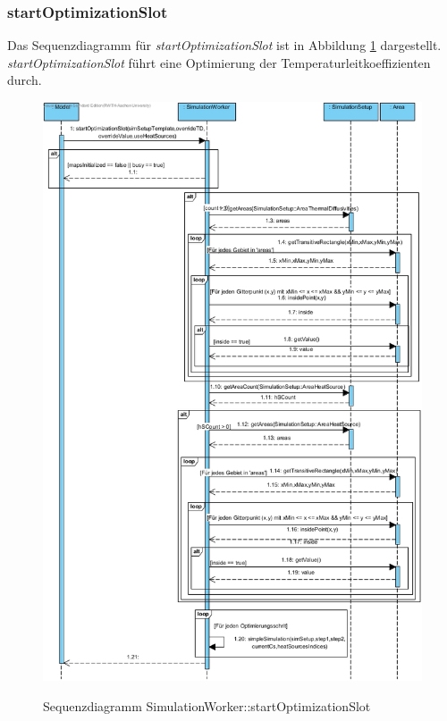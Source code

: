 \subsubsection*{startOptimizationSlot}

Das Sequenzdiagramm für \emph{startOptimizationSlot} ist in Abbildung \ref{Sequenzdiagramm SimulationWorker::startOptimizationSlot} dargestellt. \emph{startOptimizationSlot} führt eine Optimierung der Temperaturleitkoeffizienten durch.

\begin{figure}[H]
	\centering
	\includegraphics[scale=.55]{Bilder/SimulationWorker__startOptimizationSlot().jpg}\\
	\caption{Sequenzdiagramm SimulationWorker::startOptimizationSlot}
	\label{Sequenzdiagramm SimulationWorker::startOptimizationSlot}
\end{figure}

